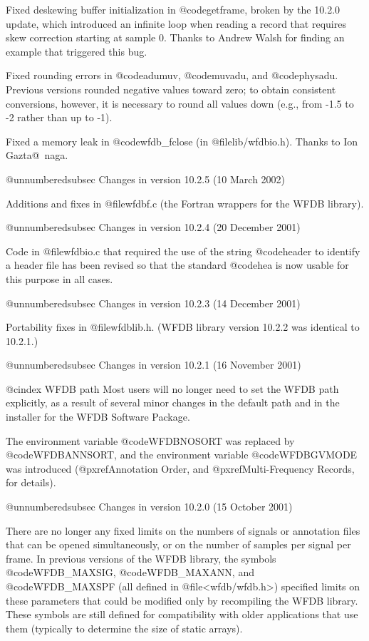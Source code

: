 {{{{{{{{Fixed deskewing buffer initialization in @code{getframe}, broken by the
10.2.0 update, which introduced an infinite loop when reading a record
that requires skew correction starting at sample 0.  Thanks to Andrew
Walsh for finding an example that triggered this bug.

Fixed rounding errors in @code{adumuv}, @code{muvadu}, and @code{physadu}.
Previous versions rounded negative values toward zero;  to obtain consistent
conversions, however, it is necessary to round all values down (e.g., from
-1.5 to -2 rather than up to -1).

Fixed a memory leak in @code{wfdb_fclose} (in @file{lib/wfdbio.h}).  Thanks to
Ion Gazta@~naga.

@unnumberedsubsec Changes in version 10.2.5 (10 March 2002)

Additions and fixes in @file{wfdbf.c} (the Fortran wrappers for the WFDB
library).

@unnumberedsubsec Changes in version 10.2.4 (20 December 2001)

Code in @file{wfdbio.c} that required the use of the string
@code{header} to identify a header file has been revised so that the
standard @code{hea} is now usable for this purpose in all cases.

@unnumberedsubsec Changes in version 10.2.3 (14 December 2001)

Portability fixes in @file{wfdblib.h}.  (WFDB library version 10.2.2 was
identical to 10.2.1.)

@unnumberedsubsec Changes in version 10.2.1 (16 November 2001)

@cindex WFDB path
Most users will no longer need to set the WFDB path explicitly, as a result
of several minor changes in the default path and in the installer for the
WFDB Software Package.

The environment variable @code{WFDBNOSORT} was replaced by @code{WFDBANNSORT},
and the environment variable @code{WFDBGVMODE} was introduced
(@pxref{Annotation Order}, and @pxref{Multi-Frequency Records}, for details).

@unnumberedsubsec Changes in version 10.2.0 (15 October 2001)

There are no longer any fixed limits on the numbers of signals or annotation
files that can be opened simultaneously, or on the number of samples per signal
per frame.  In previous versions of the WFDB library, the symbols
@code{WFDB_MAXSIG}, @code{WFDB_MAXANN}, and @code{WFDB_MAXSPF} (all defined in
@file{<wfdb/wfdb.h>}) specified limits on these parameters that could be
modified only by recompiling the WFDB library.  These symbols are still defined
for compatibility with older applications that use them (typically to determine
the size of static arrays).

}}}}}}}}
